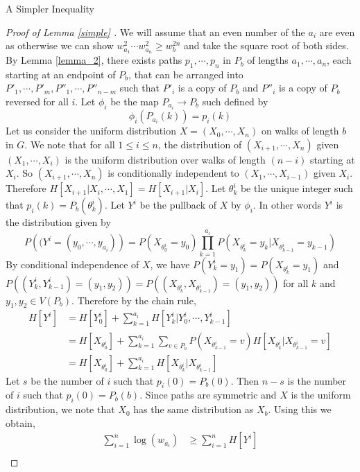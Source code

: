 \documentclass[11pt,a4paper]{article}
\begin{document}
\begin{section}{A Simpler Inequality}
\begin{proof}[Proof of Lemma \ref{simple} ]
We will assume that an even number of the $a_i$ are even as otherwise we can show $w_{a_1}^2 \cdots w_{a_n}^2 \geq w_b^{2n}$ and take the square root of both sides. By Lemma \ref{lemma_2}, there exists paths $p_1, \cdots, p_n$ in $P_b$ of lengths $a_1, \cdots, a_n$, each starting at an endpoint of $P_b$, that can be arranged into $P'_1, \cdots , P'_m, P''_1, \cdots, P''_{n - m}$ such that $P'_i$ is a copy of $P_b$ and $P''_i$ is a copy of $P_b$ reversed for all $i$. Let $\phi_i$ be the map $P_{a_i} \rightarrow P_b$ such defined by
\[
\phi_i ( P_{a_i} (k) ) = p_i (k)
\]
Let us consider the uniform distribution $X = (X_0, \cdots, X_n)$ on walks of length $b$ in $G$. We note that for all $1 \leq i\leq n$, the distribution of $(X_{i +1}, \cdots, X_n)$ given $(X_1, \cdots, X_{i} )$ is the uniform distribution over walks of length $(n - i)$ starting at $X_i$. So $(X_{i +1}, \cdots, X_n)$ is conditionally independent to $(X_1, \cdots, X_{i - 1})$ given $X_i$. Therefore $H[ X_{i + 1} | X_i, \cdots, X_1 ] = H[X_{i + 1} | X_i ]$. Let $\theta^i_k$ be the unique integer such that $p_i(k) = P_b( \theta^i_k)$. Let $Y^i$ be the pullback of $X$ by $\phi_i$. In other words $Y^i$ is the distribution given by
\[
P \left ( (Y^i = (y_0, \cdots, y_{a_i} ) \right ) = P( X_{\theta^i_0} = y_0) \prod_{k = 1}^{a_i} P(X_{\theta^i_k} = y_k | X_{\theta^i_{k - 1}} = y_{k - 1} )
\]
By conditional independence of $X$, we have $P( Y^i_k = y_1) = P(X_{\theta^i_k} = y_1)$ and $P( (Y^i_k, Y^i_{k - 1} ) = (y_1, y_2) ) = P( (X_{\theta^i_k}, X_{\theta^i_{k - 1}}) = (y_1, y_2) )$ for all $k$ and $y_1, y_2 \in V(P_b)$. Therefore by the chain rule,
\begin{align*}
H[Y^i] &= H[Y^i_0] + \sum_{k = 1}^{a_i} H[Y^i_k | Y^i_0, \cdots, Y^i_{k - 1} ]\\
& = H[X_{\theta^i_0}] + \sum_{k = 1}^{a_i} \sum_{v \in P_b} P(X_{\theta^i_{k - 1}} = v) H[ X_{\theta^i_k} | X_{\theta^i_{k - 1}} = v ]\\
&= H[ X_{ \theta^i_0} ] + \sum_{k = 1}^{a_i} H [ X_{ \theta^i_k } | X_{ \theta^i_{k - 1}} ]
\end{align*}
Let $s$ be the number of $i$ such that $p_i(0) = P_b(0)$. Then $n - s$ is the number of $i$ such that $p_i(0) = P_b(b)$. Since paths are symmetric and $X$ is the uniform distribution, we note that $X_0$ has the same distribution as $X_b$. Using this we obtain,
\begin{align*}
\sum_{i = 1}^n \log (w_{a_i}) & \geq \sum_{i = 1}^n H[Y^i] \\

\end{align*}
\end{proof}
\end{section}
\end{document}
